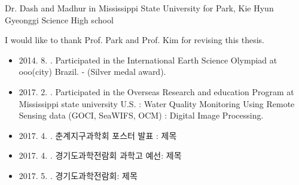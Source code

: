 \begin{acknowledgements}







Dr. Dash and Madhur in Mississippi State University for Park, Kie Hyun Gyeonggi Science High school 

I would like to thank Prof. Park and Prof. Kim for revising this thesis. 

\end{acknowledgements}

\begin{researches}
\begin{itemize}
\item{2014. 8.    . Participated in the International Earth Science Olympiad at ooo(city) Brazil. - (Silver medal award).}
\item{2017. 2.    . Participated in the Overseas Research and education Program at Mississippi state university U.S. : Water Quality Monitoring Using Remote Sensing data (GOCI, SeaWIFS, OCM) : Digital Image Processing. }
\item{2017. 4.    . 춘계지구과학회 포스터 발표 : 제목 }
\item{2017. 4.    . 경기도과학전람회 과학고 예선: 제목 }
\item{2017. 5.    . 경기도과학전람회: 제목 }
\end{itemize}
\end{researches}